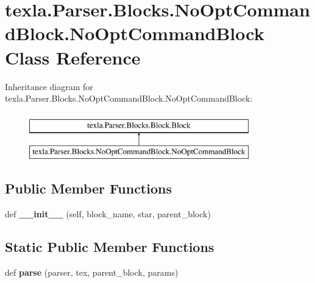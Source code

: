 \hypertarget{classtexla_1_1Parser_1_1Blocks_1_1NoOptCommandBlock_1_1NoOptCommandBlock}{}\section{texla.\+Parser.\+Blocks.\+No\+Opt\+Command\+Block.\+No\+Opt\+Command\+Block Class Reference}
\label{classtexla_1_1Parser_1_1Blocks_1_1NoOptCommandBlock_1_1NoOptCommandBlock}
Inheritance diagram for texla.\+Parser.\+Blocks.\+No\+Opt\+Command\+Block.\+No\+Opt\+Command\+Block\+:\begin{figure}[H]
\begin{center}
\leavevmode
\includegraphics[height=2.000000cm]{classtexla_1_1Parser_1_1Blocks_1_1NoOptCommandBlock_1_1NoOptCommandBlock}
\end{center}
\end{figure}
\subsection*{Public Member Functions}
\begin{DoxyCompactItemize}
\item 
\hypertarget{classtexla_1_1Parser_1_1Blocks_1_1NoOptCommandBlock_1_1NoOptCommandBlock_aac0e7414e74ce9f20f7a9e35a9beb990}{}\label{classtexla_1_1Parser_1_1Blocks_1_1NoOptCommandBlock_1_1NoOptCommandBlock_aac0e7414e74ce9f20f7a9e35a9beb990} 
def {\bfseries \+\_\+\+\_\+init\+\_\+\+\_\+} (self, block\+\_\+name, star, parent\+\_\+block)
\end{DoxyCompactItemize}
\subsection*{Static Public Member Functions}
\begin{DoxyCompactItemize}
\item 
\hypertarget{classtexla_1_1Parser_1_1Blocks_1_1NoOptCommandBlock_1_1NoOptCommandBlock_a5be4dbd0ca161ab2a3707ea5e3ce2fb4}{}\label{classtexla_1_1Parser_1_1Blocks_1_1NoOptCommandBlock_1_1NoOptCommandBlock_a5be4dbd0ca161ab2a3707ea5e3ce2fb4} 
def {\bfseries parse} (parser, tex, parent\+\_\+block, params)
\end{DoxyCompactItemize}
